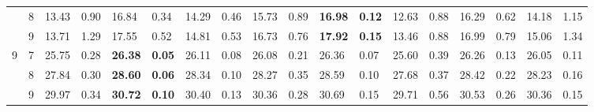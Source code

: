 \documentclass[conference]{IEEEtran}
\begin{document}
\begin{table}[t]
\begin{tabular}{|cc|ll|ll|ll|ll|ll|ll|ll|ll|}
		\multicolumn{1}{|c|}{}                    & 8          & \multicolumn{1}{l|}{13.43}         & 0.90                              & \multicolumn{1}{l|}{16.84}          & 0.34                              & \multicolumn{1}{l|}{14.29}         & 0.46                              & \multicolumn{1}{l|}{15.73}         & 0.89                              & \multicolumn{1}{l|}{\textbf{16.98}}       & \textbf{0.12} & \multicolumn{1}{l|}{12.63} & 0.88 & \multicolumn{1}{l|}{16.29}          & 0.62          & \multicolumn{1}{l|}{14.18} & 1.15 \\ \cline{2-18} 
		\multicolumn{1}{|c|}{}                    & 9          & \multicolumn{1}{l|}{13.71}         & 1.29                              & \multicolumn{1}{l|}{17.55}          & 0.52                              & \multicolumn{1}{l|}{14.81}         & 0.53                              & \multicolumn{1}{l|}{16.73}         & 0.76                              & \multicolumn{1}{l|}{\textbf{17.92}}       & \textbf{0.15} & \multicolumn{1}{l|}{13.46} & 0.88 & \multicolumn{1}{l|}{16.99}          & 0.79          & \multicolumn{1}{l|}{15.06} & 1.34 \\ \hline
		\multicolumn{1}{|c|}{\multirow{3}{*}{9}}  & 7          & \multicolumn{1}{l|}{25.75}         & 0.28                              & \multicolumn{1}{l|}{\textbf{26.38}} & \textbf{0.05}                     & \multicolumn{1}{l|}{26.11}         & 0.08                              & \multicolumn{1}{l|}{26.08}         & 0.21                              & \multicolumn{1}{l|}{26.36}                & 0.07          & \multicolumn{1}{l|}{25.60} & 0.39 & \multicolumn{1}{l|}{26.26}          & 0.13          & \multicolumn{1}{l|}{26.05} & 0.11 \\ \cline{2-18} 
		\multicolumn{1}{|c|}{}                    & 8          & \multicolumn{1}{l|}{27.84}         & 0.30                              & \multicolumn{1}{l|}{\textbf{28.60}} & \textbf{0.06}                     & \multicolumn{1}{l|}{28.34}         & 0.10                              & \multicolumn{1}{l|}{28.27}         & 0.35                              & \multicolumn{1}{l|}{28.59}                & 0.10          & \multicolumn{1}{l|}{27.68} & 0.37 & \multicolumn{1}{l|}{28.42}          & 0.22          & \multicolumn{1}{l|}{28.23} & 0.16 \\ \cline{2-18} 
		\multicolumn{1}{|c|}{}                    & 9          & \multicolumn{1}{l|}{29.97}         & 0.34                              & \multicolumn{1}{l|}{\textbf{30.72}} & \textbf{0.10}                     & \multicolumn{1}{l|}{30.40}         & 0.13                              & \multicolumn{1}{l|}{30.36}         & 0.28                              & \multicolumn{1}{l|}{30.69}                & 0.15          & \multicolumn{1}{l|}{29.71} & 0.56 & \multicolumn{1}{l|}{30.53}          & 0.26          & \multicolumn{1}{l|}{30.36} & 0.15 \\ \hline

\end{tabular}
\end{table}
\end{document}
